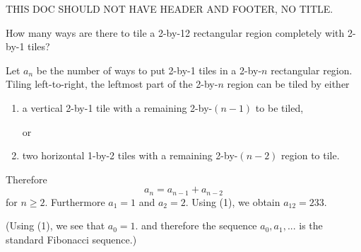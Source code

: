 



THIS DOC SHOULD NOT HAVE HEADER AND FOOTER, NO TITLE.

How many ways are there to tile a 2-by-12 rectangular region completely 
with 2-by-1 tiles?

Let $a_n$ be the number of ways to put 2-by-1 tiles in a 2-by-$n$
rectangular region.
Tiling left-to-right, the leftmost part of the 2-by-$n$ region
can be tiled by either 
\begin{enumerate}
\item a vertical 2-by-1 tile with a remaining 2-by-$(n-1)$ to be 
tiled, 
\begin{center}
\end{center}
or 
\item two horizontal 1-by-2 tiles with a remaining 2-by-$(n-2)$ region to tile.
\begin{center}
\end{center}
\end{enumerate} 

Therefore
\[
a_n = a_{n-1}+ a_{n-2} \tag{1}
\] 
for $n \geq 2$.
Furthermore $a_1 = 1$ and $a_2 = 2$.
Using (1), we obtain $a_{12} = 233$.

(Using (1), we see that $a_0 = 1$.
and therefore the sequence $a_0, a_1, ...$ 
is the standard Fibonacci sequence.)


